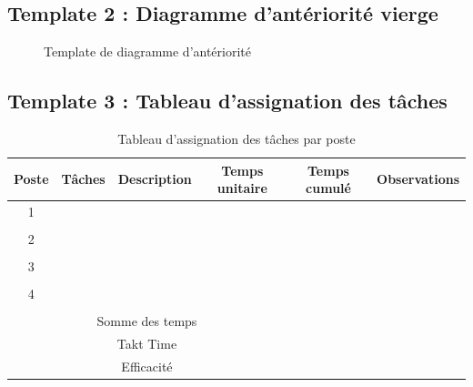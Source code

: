 \documentclass[12pt,a4paper]{article}
\begin{document}
\begin{center}
\subsection{Template 2 : Diagramme d'antériorité vierge}

\begin{figure}[H]
\centering
{}
\caption{Template de diagramme d'antériorité}
\label{fig:template_precedence}
\end{figure}

\subsection{Template 3 : Tableau d'assignation des tâches}

\begin{table}[H]
\centering
\caption{Tableau d'assignation des tâches par poste}
\label{tab:template_assignation}
\begin{tabular}{|c|c|l|c|c|c|}
\hline
\textbf{Poste} & \textbf{Tâches} & \textbf{Description} & \textbf{Temps unitaire} & \textbf{Temps cumulé} & \textbf{Observations} \\ \hline
1 & & & & & \\
 & & & & & \\
\hline
2 & & & & & \\
 & & & & & \\
\hline
3 & & & & & \\
 & & & & & \\
\hline
4 & & & & & \\
 & & & & & \\
\hline
\multicolumn{4}{|c|}{Somme des temps} & \multicolumn{2}{c|}{} \\
\multicolumn{4}{|c|}{Takt Time} & \multicolumn{2}{c|}{} \\
\multicolumn{4}{|c|}{Efficacité} & \multicolumn{2}{c|}{} \\
\hline
\end{tabular}
\end{table}


\end{center}
\end{document}
